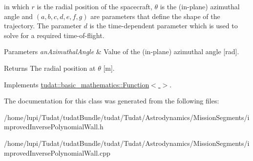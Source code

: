 in which $ r $ is the radial position of the spacecraft, $ \theta $ is the (in-\/plane) azimuthal angle and $ ( a, b, c, d, e, f, g ) $ are parameters that define the shape of the trajectory. The parameter $ d $ is the time-\/dependent parameter which is used to solve for a required time-\/of-\/flight.


\begin{DoxyParams}{Parameters}
{\em an\+Azimuthal\+Angle} & Value of the (in-\/plane) azimuthal angle \mbox{[}rad\mbox{]}. \\
\hline
\end{DoxyParams}
\begin{DoxyReturn}{Returns}
The radial position at $ \theta $ \mbox{[}m\mbox{]}. 
\end{DoxyReturn}


Implements \hyperlink{classtudat_1_1basic__mathematics_1_1Function_a69b59769da9784abaaa8a0a309d16de8}{tudat\+::basic\+\_\+mathematics\+::\+Function$<$  $>$}.



The documentation for this class was generated from the following files\+:\begin{DoxyCompactItemize}
\item 
/home/lupi/\+Tudat/tudat\+Bundle/tudat/\+Tudat/\+Astrodynamics/\+Mission\+Segments/improved\+Inverse\+Polynomial\+Wall.\+h\item 
/home/lupi/\+Tudat/tudat\+Bundle/tudat/\+Tudat/\+Astrodynamics/\+Mission\+Segments/improved\+Inverse\+Polynomial\+Wall.\+cpp\end{DoxyCompactItemize}
